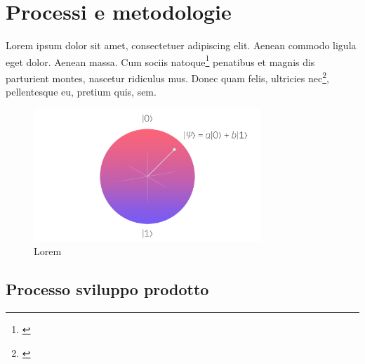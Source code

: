 \chapter{Processi e metodologie}
\label{chap:processi-metodologie}

Lorem ipsum dolor sit amet, consectetuer adipiscing elit. Aenean commodo ligula eget dolor. Aenean massa. Cum sociis natoque\footnote{\cite{site:agile-manifesto}} penatibus et magnis dis parturient montes, nascetur ridiculus mus. Donec quam felis, ultricies nec\footnote{\cite{article:spooky}}, pellentesque eu, pretium quis, sem.

\begin{figure}[h]
    \centering
    \includegraphics[height=5cm]{img/qubit.jpeg}
    \caption{Lorem}
    \label{fig:qubit}
\end{figure}
\lipsum[1]

\section{Processo sviluppo prodotto}
\lipsum[1-2]

\newpage